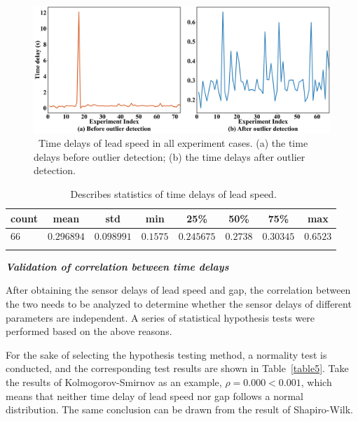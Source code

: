\documentclass[a4paper]{cas-sc}
\begin{document}
\begin{figure}
  \centering
  \includegraphics[width=14cm]{figs/fig5.png}
  \caption{~Time delays of lead speed in all experiment cases. (a) the time delays before outlier detection; (b) the time delays after outlier detection.}
  \label{fig5}
\end{figure}

\begin{table}
  \centering
  \setlength{\abovecaptionskip}{0pt}
  \setlength{\belowcaptionskip}{10pt}%
  \caption{~Describes statistics of time delays of lead speed.}
  {\begin{tabular}{lccccccc} \toprule
      count & mean       & std        & min      & 25\%       & 50\%     & 75\%      & max      \\ \midrule
      $66$  & $0.296894$ & $0.098991$ & $0.1575$ & $0.245675$ & $0.2738$ & $0.30345$ & $0.6523$ \\
      \bottomrule
      \label{table4}
    \end{tabular}}
\end{table}


\textbf{\emph{Validation of correlation between time delays}}

After obtaining the sensor delays of lead speed and gap, the correlation between the two needs to be analyzed to determine whether the sensor delays of different parameters are independent. A series of statistical hypothesis tests were performed based on the above reasons.

For the sake of selecting the hypothesis testing method, a normality test is conducted, and the corresponding test results are shown in Table~\ref{table5}. Take the results of Kolmogorov-Smirnov as an example, $\rho= 0.000<0.001$, which means that neither time delay of lead speed nor gap follows a normal distribution. The same conclusion can be drawn from the result of Shapiro-Wilk.
\end{document}
